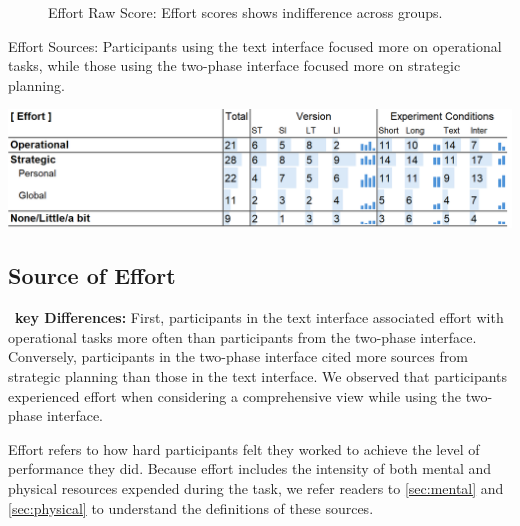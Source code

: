 \begin{figure}[h]
\begin{minipage}[t]{0.45\textwidth}
        \captionsetup{width=0.9\textwidth, justification=justified} %
        \caption{Effort Raw Score: Effort scores shows indifference across groups.}
        \label{fig:effort_cog_score}
    \end{minipage}
\end{figure}

\begin{table}[h]
    \caption{Effort Sources: Participants using the text interface focused more on operational tasks, while those using the two-phase interface focused more on strategic planning.}
    \label{tbl:physical}
    \includegraphics[width=\linewidth]{content/image/cog/effort_table.png}
\end{table}

\subsection{Source of Effort}
\label{sec:effort}

\begin{tldrbox}
   \faKey~\textbf{key Differences:} First, participants in the text interface associated effort with operational tasks more often than participants from the two-phase interface. Conversely, participants in the two-phase interface cited more sources from strategic planning than those in the text interface. We observed that participants experienced effort when considering a comprehensive view while using the two-phase interface.
   
\end{tldrbox}
Effort refers to how hard participants felt they worked to achieve the level of performance they did. Because effort includes the intensity of both mental and physical resources expended during the task, we refer readers to \cref{sec:mental} and \cref{sec:physical} to understand the definitions of these sources.


